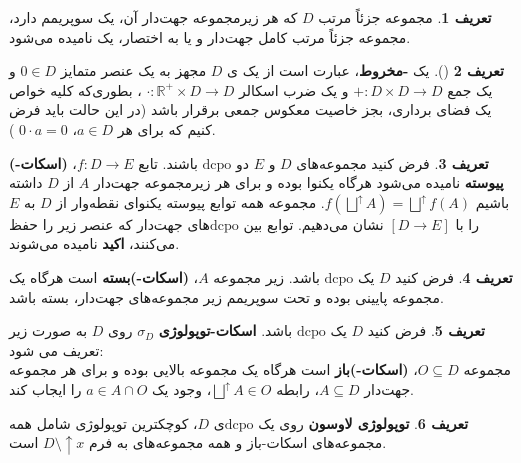\documentclass[12pt,a4paper]{article}
\theoremstyle{definition}
\newtheorem{definition}{تعریف}[section]
\theoremstyle{theorem}
\theoremstyle{definition}
\newcommand{\bR}{\mathbb{R}}
\begin{document}
\begin{definition}
مجموعه جزئاً مرتب 
$ D $
که هر زیرمجموعه جهت‌دار آن، یک سوپریمم دارد،  مجموعه جزئاً مرتب کامل جهت‌دار و یا به اختصار، یک 
\textbf{}
نامیده می‌شود.
\end{definition}
\begin{definition}[\cite{lawson 2}]
یک \textbf{-مخروط}،  
عبارت است از یک ی $ D $ مجهز به یک عنصر متمایز $ 0\in D $ و یک جمع 
$ +:D\times D\rightarrow D $
و یک ضرب اسکالر 
$ \cdot:\bR^{+}\times D\rightarrow D $%
،  بطوری‌که کلیه خواص یک فضای برداری، بجز خاصیت معکوس جمعی برقرار باشد (در این حالت باید فرض کنیم که برای هر 
$ a\in D $،  $ 0\cdot a=0 $%
).
\end{definition}
\begin{definition}
فرض کنید مجموعه‌های
$ D $
و
$ E $
دو 
$ \mathrm{dcpo} $
باشند.   تابع 
$ f:D\rightarrow E $، 
\linebreak 
 \textbf{(اسکات-) پیوسته} 
 نامیده می‌شود هرگاه یکنوا بوده و برای هر زیرمجموعه جهت‌دار 
$ A $
از
$ D $
داشته باشیم
$ f(\bigsqcup^{\uparrow}A) =\bigsqcup^{\uparrow}f(A)$.  مجموعه همه توابع پیوسته یکنوای نقطه‌وار    از
$ D $
به 
$ E $
را با
$ [D\longrightarrow E] $\index{$ [D\longrightarrow E] $}
نشان می‌دهیم.   توابع بین 
$ \mathrm{dcpo} $های جهت‌دار که عنصر زیر را حفظ می‌کنند، 
\textbf{اکید}
نامیده می‌شوند.
\end{definition}
\begin{definition}
فرض کنید 
$ D $
یک 
$ \mathrm{dcpo} $
باشد. زیر مجموعه 
$ A $،   
\textbf{(اسکات-)بسته}
 است هرگاه یک مجموعه پایینی بوده و تحت سوپریمم زیر مجموعه‌های جهت‌دار،   بسته باشد. 
\end{definition}
 \begin{definition}
فرض کنید 
$ D $
یک 
$ \mathrm{dcpo} $
باشد. 
 \textbf{اسکات-توپولوژی}
$ \sigma_{D} $
 روی $ D $ به صورت زیر تعریف می شود:
 \\
 مجموعه 
 $  O\subseteq D$،  
\textbf{(اسکات-)باز}
است هرگاه یک مجموعه بالایی بوده و برای هر مجموعه جهت‌دار $ A\subseteq D $،  رابطه 
$ \bigsqcup^{\uparrow}A\in O $،  وجود یک $  a\in A\cap O$   را ایجاب کند.

\end{definition}
\begin{definition}
\textbf{توپولوژی لاوسون}
روی یک 
$ \mathrm{dcpo} $ی
$ D $،  کوچکترین توپولوژی شامل همه مجموعه‌های اسکات-باز و همه مجموعه‌های به فرم 
$ D\setminus \uparrow x $
است.
\end{definition}
\end{document}
